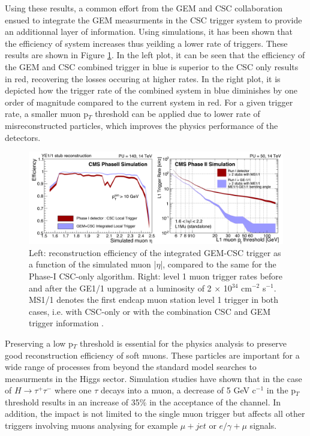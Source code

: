     Using these results, a common effort from the GEM and CSC collaboration ensued to integrate the GEM measurments in the CSC trigger system to provide an additionnal layer of information. Using simulations, it has been shown that the efficiency of system increases thus yeilding a lower rate of triggers. These results are shown in Figure \ref{fig:II-1-trigger}. In the left plot, it can be seen that the efficiency of the GEM and CSC combined trigger in blue is superior to the CSC only results in red, recovering the losses occuring at higher rates. In the right plot, it is depicted how the trigger rate of the combined system in blue diminishes by one order of magnitude compared to the current system in red. For a given trigger rate, a smaller muon p$_T$ threshold can be applied due to lower rate of misreconstructed particles, which improves the physics performance of the detectors. \\

    \begin{figure}[h!]
      \centering
      \includegraphics[width=\textwidth]{img/II-1-gem/gem-csc-efficiency.pdf}
      \caption{Left: reconstruction efficiency of the integrated GEM-CSC trigger as a function of the simulated muon |$\eta$|, compared to the same for the Phase-I CSC-only algorithm. Right: level 1 muon trigger rates before and after the GE1/1 upgrade at a luminosity of 2 $\times$ 10$^{34}$ cm$^{-2}$ s$^{-1}$. MS1/1 denotes the first endcap muon station level 1 trigger in both cases, i.e. with CSC-only or with the combination CSC and GEM trigger information \cite{Colaleo:2021453}.}
      \label{fig:II-1-trigger}
    \end{figure}

    Preserving a low p$_T$ threshold is essential for the physics analysis to preserve good reconstruction efficiency of soft muons. These particles are important for a wide range of processes from beyond the standard model searches to measurments in the Higgs sector. Simulation studies have shown that in the case of $ H \rightarrow \tau^+ \tau^- $ where one $ \tau $ decays into a muon, a decrease of 5 GeV c$^{-1}$ in the p$_T$ threshold results in an increase of 35\% in the acceptance of the channel. In addition, the impact is not limited to the single muon trigger but affects all other triggers involving muons analysing for example $\mu+jet$ or $e/\gamma+\mu$ signals. \\

